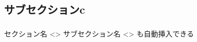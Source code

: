 \subsection{サブセクションc}
\begin{frame}{}
  \frametitle{\insertsubsection}
  セクション名
  <\insertsection>
  サブセクション名
  <\insertsubsection>
  も自動挿入できる
\end{frame}
